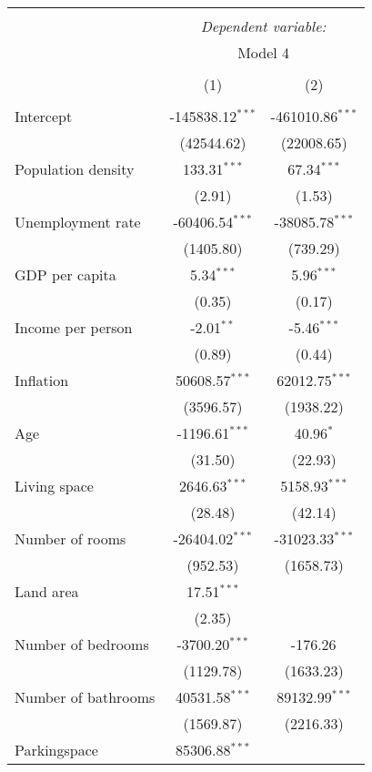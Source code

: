 \begin{table}[!htbp] \centering
\begin{tabular}{@{\extracolsep{5pt}}lcc}
\\[-1.8ex]\hline
\hline \\[-1.8ex]
& \multicolumn{2}{c}{\textit{Dependent variable:}} \
\cr \cline{2-3}
\\[-1.8ex] & \multicolumn{2}{c}{Model 4} \\\\[-1.8ex] & (1) & (2) \\
\hline \\[-1.8ex]
 Intercept & -145838.12$^{***}$ & -461010.86$^{***}$ \\
  & (42544.62) & (22008.65) \\
 Population density & 133.31$^{***}$ & 67.34$^{***}$ \\
  & (2.91) & (1.53) \\
 Unemployment rate & -60406.54$^{***}$ & -38085.78$^{***}$ \\
  & (1405.80) & (739.29) \\
 GDP per capita & 5.34$^{***}$ & 5.96$^{***}$ \\
  & (0.35) & (0.17) \\
 Income per person & -2.01$^{**}$ & -5.46$^{***}$ \\
  & (0.89) & (0.44) \\
 Inflation & 50608.57$^{***}$ & 62012.75$^{***}$ \\
  & (3596.57) & (1938.22) \\
 Age & -1196.61$^{***}$ & 40.96$^{*}$ \\
  & (31.50) & (22.93) \\
 Living space & 2646.63$^{***}$ & 5158.93$^{***}$ \\
  & (28.48) & (42.14) \\
 Number of rooms & -26404.02$^{***}$ & -31023.33$^{***}$ \\
  & (952.53) & (1658.73) \\
 Land area & 17.51$^{***}$ & \\
  & (2.35) & \\
 Number of bedrooms & -3700.20$^{***}$ & -176.26$^{}$ \\
  & (1129.78) & (1633.23) \\
 Number of bathrooms & 40531.58$^{***}$ & 89132.99$^{***}$ \\
  & (1569.87) & (2216.33) \\
 Parkingspace & 85306.88$^{***}$ & \\

\end{tabular}
\end{table}
